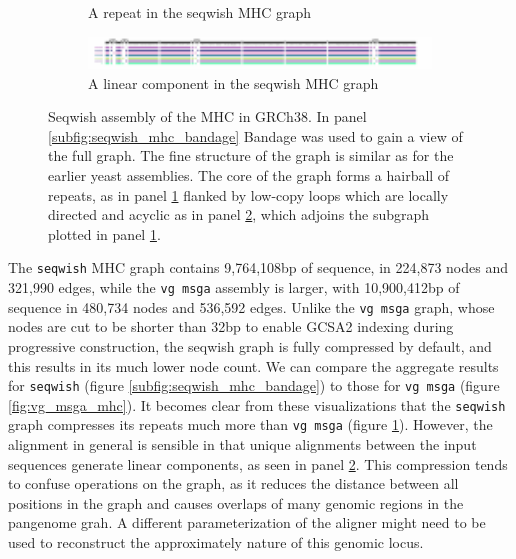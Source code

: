 \begin{figure}[htbp!]
\begin{subfigure}[t]{0.49\textwidth}
    \caption{A repeat in the seqwish MHC graph}
    \label{subfig:seqwish_mhc_neato}
  \end{subfigure}
  \begin{subfigure}[t]{0.9\textwidth}
    \includegraphics[width=1.0\textwidth]{Chapter3/Figs/seqwish_MHC_n492324_viz.pdf}
    \caption{A linear component in the seqwish MHC graph}
    \label{subfig:seqwish_mhc_viz}
  \end{subfigure}
  \caption[Seqwish assembly of the MHC in GRCh38.]{
    Seqwish assembly of the MHC in GRCh38.
    In panel \ref{subfig:seqwish_mhc_bandage} Bandage was used to gain a view of the full graph.
    The fine structure of the graph is similar as for the earlier yeast assemblies.
    The core of the graph forms a hairball of repeats, as in panel \ref{subfig:seqwish_mhc_neato} flanked by low-copy loops which are locally directed and acyclic as in panel \ref{subfig:seqwish_mhc_viz}, which adjoins the subgraph plotted in panel \ref{subfig:seqwish_mhc_neato}.
  }
  \label{fig:seqwish_mhc}
\end{figure}

The {\tt seqwish} MHC graph contains 9,764,108bp of sequence, in 224,873 nodes and 321,990 edges, while the {\tt vg msga} assembly is larger, with 10,900,412bp of sequence in 480,734 nodes and 536,592 edges.
Unlike the {\tt vg msga} graph, whose nodes are cut to be shorter than 32bp to enable GCSA2 indexing during progressive construction, the seqwish graph is fully compressed by default, and this results in its much lower node count.
We can compare the aggregate results for {\tt seqwish} (figure \ref{subfig:seqwish_mhc_bandage}) to those for {\tt vg msga} (figure \ref{fig:vg_msga_mhc}).
It becomes clear from these visualizations that the {\tt seqwish} graph compresses its repeats much more than {\tt vg msga} (figure \ref{subfig:seqwish_mhc_neato}).
However, the alignment in general is sensible in that unique alignments between the input sequences generate linear components, as seen in panel \ref{subfig:seqwish_mhc_viz}.
This compression tends to confuse operations on the graph, as it reduces the distance between all positions in the graph and causes overlaps of many genomic regions in the pangenome grah.
A different parameterization of the aligner might need to be used to reconstruct the approximately nature of this genomic locus.


